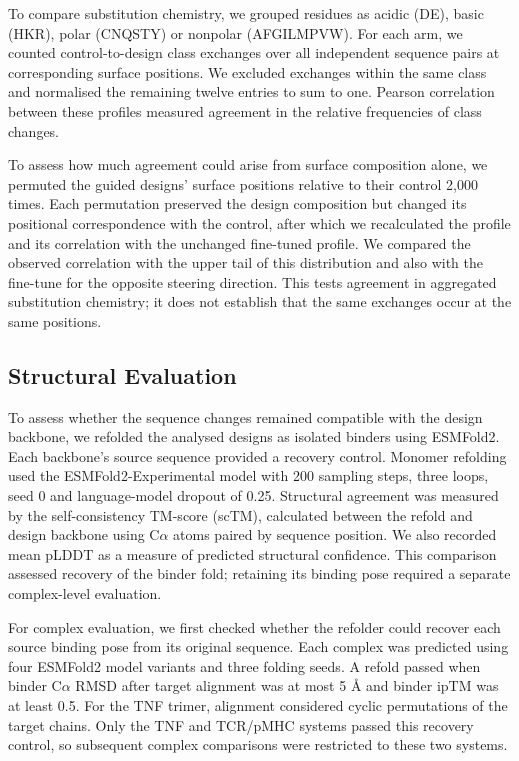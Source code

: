 To compare substitution chemistry, we grouped residues as acidic (DE), basic (HKR), polar (CNQSTY) or nonpolar (AFGILMPVW). For each arm, we counted control-to-design class exchanges over all independent sequence pairs at corresponding surface positions. We excluded exchanges within the same class and normalised the remaining twelve entries to sum to one. Pearson correlation between these profiles measured agreement in the relative frequencies of class changes.

To assess how much agreement could arise from surface composition alone, we permuted the guided designs' surface positions relative to their control 2,000 times. Each permutation preserved the design composition but changed its positional correspondence with the control, after which we recalculated the profile and its correlation with the unchanged fine-tuned profile. We compared the observed correlation with the upper tail of this distribution and also with the fine-tune for the opposite steering direction. This tests agreement in aggregated substitution chemistry; it does not establish that the same exchanges occur at the same positions.

\subsection{Structural Evaluation}
\label{app:jaxka-design-structural-evaluation}

To assess whether the sequence changes remained compatible with the design backbone, we refolded the analysed designs as isolated binders using ESMFold2.\supercite{biohubESMFold2ModelCard2026} Each backbone's source sequence provided a recovery control. Monomer refolding used the ESMFold2-Experimental model with 200 sampling steps, three loops, seed 0 and language-model dropout of 0.25. Structural agreement was measured by the self-consistency TM-score (scTM), calculated between the refold and design backbone using C$\alpha$ atoms paired by sequence position. We also recorded mean pLDDT as a measure of predicted structural confidence. This comparison assessed recovery of the binder fold; retaining its binding pose required a separate complex-level evaluation.

For complex evaluation, we first checked whether the refolder could recover each source binding pose from its original sequence. Each complex was predicted using four ESMFold2 model variants and three folding seeds. A refold passed when binder C$\alpha$ RMSD after target alignment was at most 5 \AA{} and binder ipTM was at least 0.5. For the TNF trimer, alignment considered cyclic permutations of the target chains. Only the TNF and TCR/pMHC systems passed this recovery control, so subsequent complex comparisons were restricted to these two systems.

